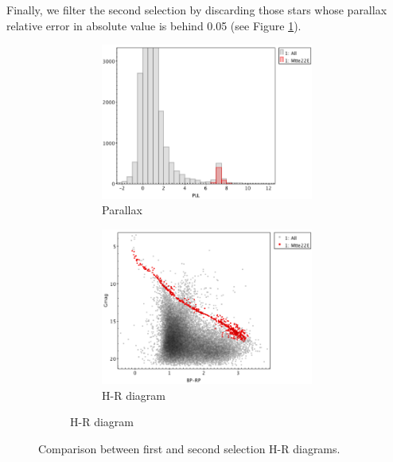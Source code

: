 \documentclass[11pt, a4paper, english]{book}
\begin{document}
Finally, we filter the second selection by discarding those stars whose parallax relative error in absolute value is behind 0.05
(see Figure \ref{fig:clusterix_final_selection_melotte_22}).

\begin{figure}[htbp]
  \centering
  \begin{subfigure}{0.9\textwidth}
    \centering
    \begin{subfigure}[t]{0.45\textwidth}
      \centering
      \includegraphics[width=\textwidth]{../figures/clusterix/topcat_3rd_selection_parallax_melotte_22.png}
      \caption{Parallax}
    \end{subfigure}
    \hfill
    \begin{subfigure}[t]{0.45\textwidth}
      \centering
      \includegraphics[width=\textwidth]{../figures/clusterix/topcat_3rd_selection_hr_diagram_melotte_22.png}
      \caption{H-R diagram}
    \end{subfigure}
  \end{subfigure}
  \caption{Comparison between first and second selection H-R diagrams.}
  \label{fig:clusterix_final_selection_melotte_22}
\end{figure}
\end{document}
